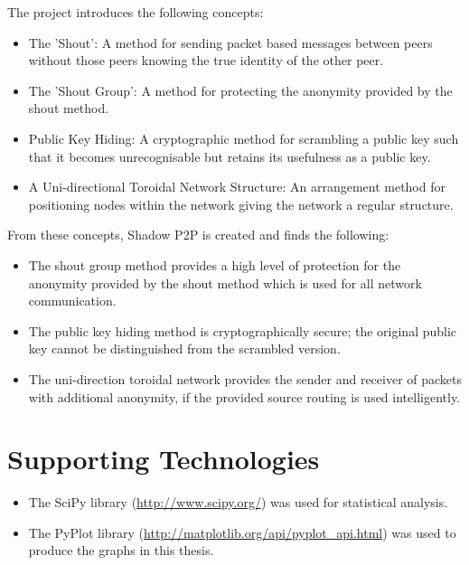 \documentclass[ %
                    author={Luke Murray},
                supervisor={Dr. Simon Hollis},
                     title={Shadow Peer-to-Peer Networks},
                  subtitle={},
                    degree={MEng},
                      year={2013} ]{thesis}
\begin{document}
The project introduces the following concepts:
\begin{itemize}
\item The 'Shout': A method for sending packet based messages between peers without those peers knowing the true identity of the other peer.
\item The 'Shout Group': A method for protecting the anonymity provided by the shout method.
\item Public Key Hiding: A cryptographic method for scrambling a public key such that it becomes unrecognisable but retains its usefulness as a public key.
\item A Uni-directional Toroidal Network Structure: An arrangement method for positioning nodes within the network giving the network a regular structure.
\end{itemize}

From these concepts, Shadow P2P is created and finds the following:
\begin{itemize}
\item The shout group method provides a high level of protection for the anonymity provided by the shout method which is used for all network communication.
\item The public key hiding method is cryptographically secure; the original public key cannot be distinguished from the scrambled version.
\item The uni-direction toroidal network provides the sender and receiver of packets with additional anonymity, if the provided source routing is used intelligently.
\end{itemize}

\tableofcontents


\chapter*{Supporting Technologies}

\begin{itemize}
\item The SciPy library (\url{http://www.scipy.org/}) was used for statistical analysis.
\item The PyPlot library (\url{http://matplotlib.org/api/pyplot_api.html}) was used to produce the graphs in this thesis.
\end{itemize}

\end{document}
